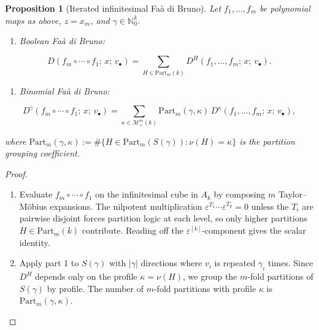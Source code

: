 \documentclass[10pt,a4paper]{article}
\theoremstyle{plain}
\newtheorem{proposition}[theorem]{Proposition}
\theoremstyle{definition}
\newcommand{\IN}{\mathbb{N}} %
\newcommand{\1}{\mathbb{1}} %
\newcommand{\set}[1]{\{#1\}} %
\newcommand{\eps}{\varepsilon} %
\newcommand{\tightlist}{\setlength{\itemsep}{0pt}\setlength{\parskip}{0pt}}
\newcommand{\KM}{\mathcal{M}} %
\newcommand{\Part}{\mathrm{Part}} %
\begin{document}
\begin{proposition}[Iterated infinitesimal Faà di Bruno]

\label{prop:poly-iterated-fdb} Let \(f_1, \dots, f_m\) be polynomial
maps as above, \(z = x_m\), and \(\gamma \in \IN_0^k\).

\begin{enumerate}
\def\labelenumi{\arabic{enumi})}
\tightlist
\item
  \emph{Boolean Faà di Bruno:}
\end{enumerate}

\[
  D(f_m \circ \cdots \circ f_1;\, x;\, v_\bullet) = \sum_{H \in \Part_m(k)} D^H(f_1, \dots, f_m;\, x;\, v_\bullet).
\]

\begin{enumerate}
\def\labelenumi{\arabic{enumi})}
\setcounter{enumi}{1}
\tightlist
\item
  \emph{Binomial Faà di Bruno:}
\end{enumerate}

\[
  D^\gamma(f_m \circ \cdots \circ f_1;\, x;\, v_\bullet) = \sum_{\kappa \in \KM_+^m(k)} \Part_m(\gamma, \kappa)\, D^\kappa(f_1, \dots, f_m;\, x;\, v_\bullet),
\]

where
\(\Part_m(\gamma, \kappa) := \#\set{H \in \Part_m(S(\gamma)) : \nu(H) = \kappa}\)
is the partition grouping coefficient.

\end{proposition}

\begin{proof}

\begin{enumerate}
\def\labelenumi{\arabic{enumi})}
\item
  Evaluate \(f_m \circ \cdots \circ f_1\) on the infinitesimal cube in
  \(A_k\) by composing \(m\) Taylor--Möbius expansions. The nilpotent
  multiplication \(\eps^{T_1} \cdots \eps^{T_p} = 0\) unless the \(T_i\)
  are pairwise disjoint forces partition logic at each level, so only
  higher partitions \(H \in \Part_m(k)\) contribute. Reading off the
  \(\eps^{[k]}\)-component gives the scalar identity.
\item
  Apply part 1 to \(S(\gamma)\) with \(|\gamma|\) directions where
  \(v_i\) is repeated \(\gamma_i\) times. Since \(D^H\) depends only on
  the profile \(\kappa = \nu(H)\), we group the \(m\)-fold partitions of
  \(S(\gamma)\) by profile. The number of \(m\)-fold partitions with
  profile \(\kappa\) is \(\Part_m(\gamma, \kappa)\).
\end{enumerate}

\end{proof}
\end{document}
